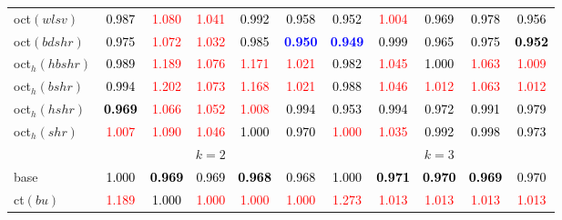 \begin{tabular}[t]{l|>{}cccc>{}c|ccccc}
oct$(wlsv)$ & \textcolor{black}{0.987} & \textcolor{red}{1.080} & \textcolor{red}{1.041} & \textcolor{black}{0.992} & \textcolor{black}{0.958} & \textcolor{black}{0.952} & \textcolor{red}{1.004} & \textcolor{black}{0.969} & \textcolor{black}{0.978} & \textcolor{black}{0.956}\\
oct$(bdshr)$ & \textcolor{black}{0.975} & \textcolor{red}{1.072} & \textcolor{red}{1.032} & \textcolor{black}{0.985} & \textcolor{blue}{\textbf{0.950}} & \textcolor{blue}{\textbf{0.949}} & \textcolor{black}{0.999} & \textcolor{black}{0.965} & \textcolor{black}{0.975} & \textcolor{black}{\textbf{0.952}}\\
oct$_h(hbshr)$ & \textcolor{black}{0.989} & \textcolor{red}{1.189} & \textcolor{red}{1.076} & \textcolor{red}{1.171} & \textcolor{red}{1.021} & \textcolor{black}{0.982} & \textcolor{red}{1.045} & \textcolor{black}{1.000} & \textcolor{red}{1.063} & \textcolor{red}{1.009}\\
oct$_h(bshr)$ & \textcolor{black}{0.994} & \textcolor{red}{1.202} & \textcolor{red}{1.073} & \textcolor{red}{1.168} & \textcolor{red}{1.021} & \textcolor{black}{0.988} & \textcolor{red}{1.046} & \textcolor{red}{1.012} & \textcolor{red}{1.063} & \textcolor{red}{1.012}\\
oct$_h(hshr)$ & \textcolor{black}{\textbf{0.969}} & \textcolor{red}{1.066} & \textcolor{red}{1.052} & \textcolor{red}{1.008} & \textcolor{black}{0.994} & \textcolor{black}{0.953} & \textcolor{black}{0.994} & \textcolor{black}{0.972} & \textcolor{black}{0.991} & \textcolor{black}{0.979}\\
oct$_h(shr)$ & \textcolor{red}{1.007} & \textcolor{red}{1.090} & \textcolor{red}{1.046} & \textcolor{black}{1.000} & \textcolor{black}{0.970} & \textcolor{red}{1.000} & \textcolor{red}{1.035} & \textcolor{black}{0.992} & \textcolor{black}{0.998} & \textcolor{black}{0.973}\\
\addlinespace[0.3em]
\multicolumn{1}{c}{} & \multicolumn{5}{c}{\textbf{$k = 2$}} & \multicolumn{5}{c}{\textbf{$k = 3$}}\\
base & \textcolor{black}{1.000} & \textcolor{black}{\textbf{0.969}} & \textcolor{black}{0.969} & \textcolor{black}{\textbf{0.968}} & \textcolor{black}{0.968} & \textcolor{black}{1.000} & \textcolor{black}{\textbf{0.971}} & \textcolor{black}{\textbf{0.970}} & \textcolor{black}{\textbf{0.969}} & \textcolor{black}{0.970}\\
ct$(bu)$ & \textcolor{red}{1.189} & \textcolor{black}{1.000} & \textcolor{red}{1.000} & \textcolor{red}{1.000} & \textcolor{red}{1.000} & \textcolor{red}{1.273} & \textcolor{red}{1.013} & \textcolor{red}{1.013} & \textcolor{red}{1.013} & \textcolor{red}{1.013}\\

\end{tabular}
